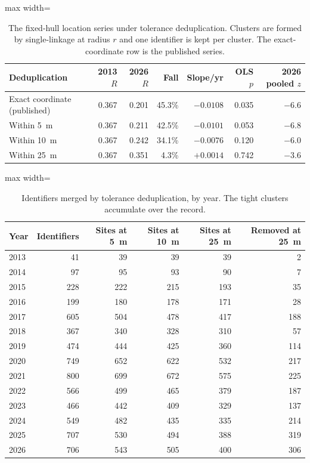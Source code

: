 \documentclass[fleqn,10pt]{wlpeerj}
\begin{document}
\begin{table}[H]
\centering
\caption{The fixed-hull location series under tolerance deduplication. Clusters are formed by
single-linkage at radius $r$ and one identifier is kept per cluster. The exact-coordinate row is
the published series.}
\label{si:ndtable}
\small
\begin{adjustbox}{max width=\linewidth}
\begin{tabular}{lrrrrrr}
\toprule
Deduplication & 2013 $R$ & 2026 $R$ & Fall & Slope/yr & OLS $p$ & 2026 pooled $z$ \\
\midrule
Exact coordinate (published) & 0.367 & 0.201 & 45.3\% & $-0.0108$ & 0.035 & $-6.6$ \\
Within \SI{5}{\meter} & 0.367 & 0.211 & 42.5\% & $-0.0101$ & 0.053 & $-6.8$ \\
Within \SI{10}{\meter} & 0.367 & 0.242 & 34.1\% & $-0.0076$ & 0.120 & $-6.0$ \\
Within \SI{25}{\meter} & 0.367 & 0.351 & 4.3\% & $+0.0014$ & 0.742 & $-3.6$ \\
\bottomrule
\end{tabular}
\end{adjustbox}
\end{table}

\begin{table}[H]
\centering
\caption{Identifiers merged by tolerance deduplication, by year. The tight clusters accumulate
over the record.}
\label{si:ndmerge}
\small
\begin{adjustbox}{max width=\linewidth}
\begin{tabular}{lrrrrr}
\toprule
Year & Identifiers & Sites at \SI{5}{\meter} & Sites at \SI{10}{\meter} & Sites at \SI{25}{\meter} & Removed at \SI{25}{\meter} \\
\midrule
2013 & 41 & 39 & 39 & 39 & 2 \\
2014 & 97 & 95 & 93 & 90 & 7 \\
2015 & 228 & 222 & 215 & 193 & 35 \\
2016 & 199 & 180 & 178 & 171 & 28 \\
2017 & 605 & 504 & 478 & 417 & 188 \\
2018 & 367 & 340 & 328 & 310 & 57 \\
2019 & 474 & 444 & 425 & 360 & 114 \\
2020 & 749 & 652 & 622 & 532 & 217 \\
2021 & 800 & 699 & 672 & 575 & 225 \\
2022 & 566 & 499 & 465 & 379 & 187 \\
2023 & 466 & 442 & 409 & 329 & 137 \\
2024 & 549 & 482 & 435 & 335 & 214 \\
2025 & 707 & 530 & 494 & 388 & 319 \\
2026 & 706 & 543 & 505 & 400 & 306 \\
\bottomrule
\end{tabular}
\end{adjustbox}
\end{table}
\end{document}
